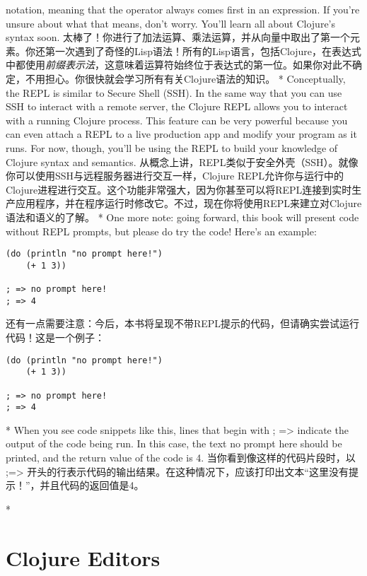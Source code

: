 \begin{paracol}{2}
{notation}, meaning that the operator always comes first in an
expression. If you're unsure about what that means, don't worry. You'll
learn all about Clojure's syntax soon.
\switchcolumn
太棒了！你进行了加法运算、乘法运算，并从向量中取出了第一个元素。你还第一次遇到了奇怪的Lisp语法！所有的Lisp语言，包括Clojure，在表达式中都使用\emph{前缀表示法}，这意味着运算符始终位于表达式的第一位。如果你对此不确定，不用担心。你很快就会学习所有有关Clojure语法的知识。
\switchcolumn[0]*
Conceptually, the REPL is similar to Secure Shell (SSH). In the same way
that you can use SSH to interact with a remote server, the Clojure REPL
allows you to interact with a running Clojure process. This feature can
be very powerful because you can even attach a REPL to a live production
app and modify your program as it runs. For now, though, you'll be using
the REPL to build your knowledge of Clojure syntax and semantics.
\switchcolumn
从概念上讲，REPL类似于安全外壳（SSH）。就像你可以使用SSH与远程服务器进行交互一样，Clojure REPL允许你与运行中的Clojure进程进行交互。这个功能非常强大，因为你甚至可以将REPL连接到实时生产应用程序，并在程序运行时修改它。不过，现在你将使用REPL来建立对Clojure语法和语义的了解。
\switchcolumn[0]*
One more note: going forward, this book will present code without REPL
prompts, but please do try the code! Here's an example:
\begin{verbatim}
(do (println "no prompt here!")
    (+ 1 3))

; => no prompt here!
; => 4
\end{verbatim}
\switchcolumn
还有一点需要注意：今后，本书将呈现不带REPL提示的代码，但请确实尝试运行代码！这是一个例子：
\begin{verbatim}
(do (println "no prompt here!")
    (+ 1 3))

; => no prompt here!
; => 4
\end{verbatim}
\switchcolumn[0]*
When you see code snippets like this, lines that begin with ;
=\textgreater{} indicate the output of the code being run. In this case,
the text no prompt here should be printed, and the return value of the
code is 4.
\switchcolumn
当你看到像这样的代码片段时，以 ;=\textgreater{} 开头的行表示代码的输出结果。在这种情况下，应该打印出文本“这里没有提示！”，并且代码的返回值是4。

\switchcolumn[0]*
\section{Clojure Editors}
\switchcolumn

\end{paracol}
